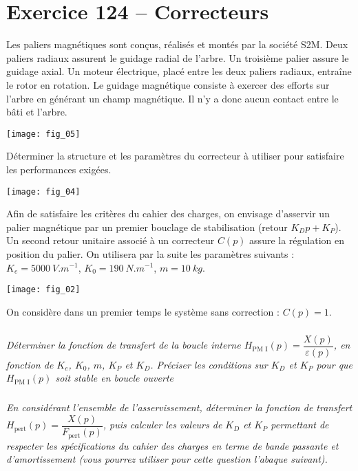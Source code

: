 \section*{Exercice 124 -- Correcteurs}
\setcounter{exo}{0}

Les paliers magnétiques sont conçus, réalisés et montés par la société S2M.
Deux paliers radiaux assurent le guidage radial de l'arbre. Un troisième
palier assure le guidage axial. Un moteur électrique, placé entre les deux
paliers radiaux, entraîne le rotor en rotation. Le guidage magnétique consiste à exercer des efforts sur l'arbre en générant un
champ magnétique. Il n'y a donc aucun contact entre le bâti et l'arbre.

\begin{center}
\texttt{[image: fig\_05]}
\end{center}


\begin{obj}
Déterminer la structure et les paramètres du correcteur à utiliser pour satisfaire les performances exigées.
\end{obj}


\begin{center}
\texttt{[image: fig\_04]}
\end{center}


Afin de satisfaire les critères du cahier des charges, on envisage d'asservir un
palier magnétique par un premier bouclage de stabilisation (retour $K_D p+K_P$).
Un second retour unitaire associé à un correcteur $C(p)$ assure la régulation en
position du palier. On utilisera par la suite les
paramètres suivants : $K_e=\SI{5000}{V.m^{-1}}$, $K_0=\SI{190}{N.m^{-1}}$, $m=\SI{10}{kg}$.

\begin{center}
\texttt{[image: fig\_02]}
\end{center}

On considère dans un premier temps le système sans correction : $C(p)=1$.

\subparagraph{}\textit{Déterminer la fonction de transfert de la boucle interne $H_{\text{PM I}}(p) = \dfrac{X(p)}{\varepsilon(p)}$, en fonction de $K_e$, $K_0$, $m$, $K_P$ et $K_D$. Préciser les conditions
sur $K_D$ et $K_P$ pour que $H_{\text{PM I}}(p)$ soit stable en boucle ouverte}


\subparagraph{}\textit{En considérant l’ensemble de l’asservissement, déterminer la
fonction de transfert $H_{\text{pert}}(p) = \dfrac{X(p)}{F_{\text{pert}}(p)}$, puis calculer les valeurs de $K_D$ et $K_P$
permettant de respecter les spécifications du cahier des charges en terme de
bande passante et d’amortissement (vous pourrez utiliser pour cette question l’abaque suivant).}

